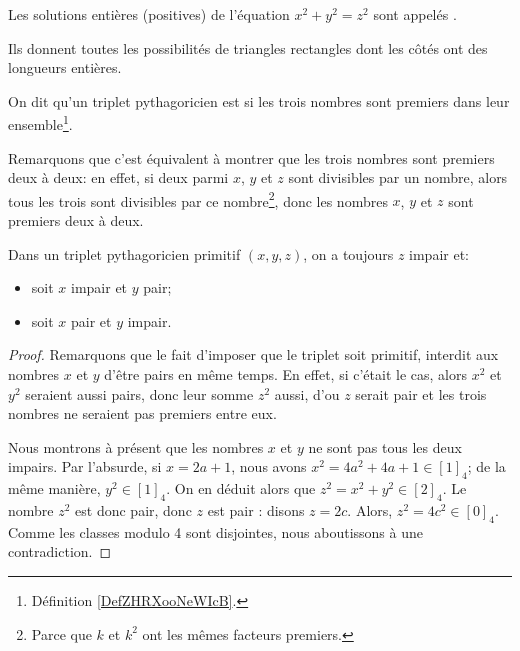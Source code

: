 \begin{definition}
	Les solutions entières (positives) de l'équation \( x^2+y^2=z^2\) sont appelés .
\end{definition}

Ils donnent toutes les possibilités de triangles rectangles dont les côtés ont des longueurs entières.

\begin{definition}
	On dit qu'un triplet pythagoricien est  si les trois nombres sont premiers dans leur ensemble\footnote{Définition \ref{DefZHRXooNeWIcB}.}.
\end{definition}

Remarquons que c'est équivalent à montrer que les trois nombres sont premiers deux à deux: en effet, si deux parmi \( x\), \( y\) et \( z\) sont divisibles par un nombre, alors tous les trois sont divisibles par ce nombre\footnote{Parce que \( k\) et \( k^2\) ont les mêmes facteurs premiers.}, donc les nombres \( x\), \( y\) et \( z\) sont premiers deux à deux.

\begin{lemma}    \label{LemTripletsPythagoriciensPrimitifs}
	Dans un triplet pythagoricien primitif \( (x, y, z) \), on a toujours \( z\) impair et:
	\begin{itemize}
		\item
		      soit \( x\) impair et \( y\) pair;
		\item
		      soit \( x\) pair et \( y\) impair.
	\end{itemize}
\end{lemma}

\begin{proof}
	Remarquons que le fait d'imposer que le triplet soit primitif, interdit aux nombres \( x\) et \( y\) d'être pairs en même temps. En effet, si c'était le cas, alors \( x^2 \) et \( y^2 \) seraient aussi pairs, donc leur somme \( z^2 \) aussi, d'ou \( z\) serait pair et les trois nombres ne seraient pas premiers entre eux.

	Nous montrons à présent que les nombres \( x\) et \( y\) ne sont pas tous les deux impairs. Par l'absurde, si \( x=2a+1\), nous avons \( x^2=4a^2+4a+1\in [1]_4\); de la même manière,  \( y^2 \in [1]_4\). On en déduit alors que \( z^2=x^2+y^2\in [2]_4\). Le nombre \(  z^2\) est donc pair, donc \( z\) est pair : disons \( z=2c\). Alors, \( z^2=4c^2\in [0]_4\). Comme les classes modulo 4 sont disjointes, nous aboutissons à une contradiction.
\end{proof}

